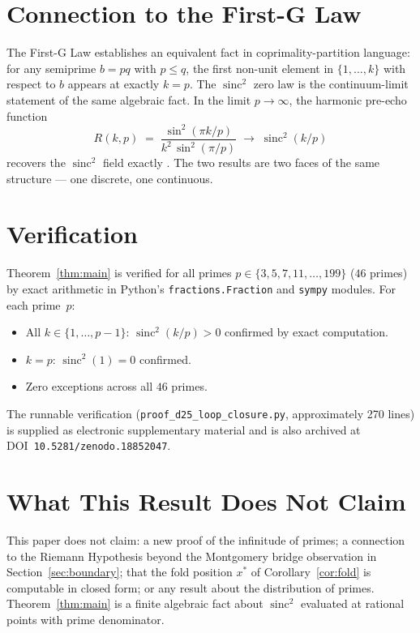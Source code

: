 \documentclass[11pt,reqno]{amsart}
\theoremstyle{plain}
\theoremstyle{remark}
\DeclareMathOperator{\sinc}{sinc}
\begin{document}
\section{Connection to the First-G Law}\label{sec:firstG}

The First-G Law \cite{SandersWP34} establishes an equivalent fact
in coprimality-partition language: for any semiprime $b=pq$ with
$p\le q$, the first non-unit element in $\{1,\dots,k\}$ with
respect to $b$ appears at exactly $k=p$. The $\sinc^2$ zero law is
the continuum-limit statement of the same algebraic fact. In the
limit $p\to\infty$, the harmonic pre-echo function
\begin{equation}\label{eq:R}
  R(k,p)\;=\;\frac{\sin^2(\pi k/p)}{k^2\,\sin^2(\pi/p)}
  \;\longrightarrow\; \sinc^2(k/p)
\end{equation}
recovers the $\sinc^2$ field exactly \cite{SandersWP35}. The two
results are two faces of the same structure --- one discrete, one
continuous.

\section{Verification}\label{sec:verify}

Theorem~\ref{thm:main} is verified for all primes
$p\in\{3,5,7,11,\dots,199\}$ ($46$ primes) by exact arithmetic in
Python's \texttt{fractions.Fraction} and \texttt{sympy} modules.
For each prime~$p$:
\begin{itemize}\setlength\itemsep{1pt}
  \item All $k\in\{1,\dots,p-1\}$: $\sinc^2(k/p)>0$ confirmed by
        exact computation.
  \item $k=p$: $\sinc^2(1)=0$ confirmed.
  \item Zero exceptions across all $46$ primes.
\end{itemize}

The runnable verification
(\texttt{proof\_d25\_loop\_closure.py}, approximately 270 lines)
is supplied as electronic supplementary material and is also
archived at DOI~\texttt{10.5281/zenodo.18852047}.

\section{What This Result Does Not Claim}\label{sec:limits}

This paper does not claim: a new proof of the infinitude of
primes; a connection to the Riemann Hypothesis beyond the
Montgomery bridge observation in Section~\ref{sec:boundary}; that
the fold position $x^{*}$ of Corollary~\ref{cor:fold} is
computable in closed form; or any result about the distribution
of primes. Theorem~\ref{thm:main} is a finite algebraic fact about
$\sinc^2$ evaluated at rational points with prime denominator.
\end{document}
